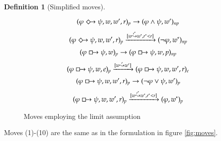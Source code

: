 \documentclass[a4paper,american]{paper}
\theoremstyle{definition}\newtheorem{definition}{Definition}
\begin{document}
\begin{definition}[Simplified moves]
\begin{figure}[H]
\begin{equation}
		(\varphi\Diamondright\psi ,w,w',r)_{p}\rightarrow (\varphi\wedge\psi ,w')_{np}
	\end{equation}
	\begin{equation}
		(\varphi\Diamondright\psi ,w,w',r)_{p}\xrightarrow{[w\overset{r^*}{\leadsto}w^*, r^*<r]} (\neg\varphi ,w^*)_{np}
	\end{equation}
	\begin{equation}
		(\varphi\boxright\psi ,w)_{p}\rightarrow (\varphi\boxright\psi ,w,p)_{np}
	\end{equation}
	\begin{equation}
		(\varphi\boxright\psi ,w,e)_{p}\xrightarrow{[w\overset{r}{\leadsto}w']} (\varphi\boxright\psi ,w,w',r)_{e}
	\end{equation}
	\begin{equation}
		(\varphi\boxright\psi ,w,w',r)_{p}\rightarrow (\neg\varphi\vee\psi ,w')_{p}
	\end{equation}
	\begin{equation}
		(\varphi\boxright\psi ,w,w',r)_{p}\xrightarrow{[w\overset{r^*}{\leadsto}w^*, r^*<r]} (\varphi ,w^*)_{p}
	\end{equation}
	\caption{Moves employing the limit assumption}
	\label{fig:limit_ass_moves}
\end{figure}
\end{definition}
Moves (1)-(10) are the same as in the formulation in figure \ref{fig:moves}.\\
\end{document}
